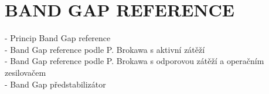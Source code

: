 \section{BAND GAP REFERENCE}
- Princip Band Gap reference\\
- Band Gap reference podle P. Brokawa s aktivní zátěží\\
- Band Gap reference podle P. Brokawa s odporovou zátěží a operačním zesilovačem\\
- Band Gap předstabilizátor\\